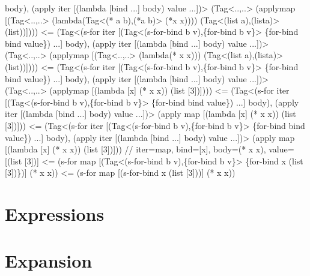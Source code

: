 \begin{Codes}
           body),
         (apply iter [(lambda [bind ...] body) value ...])>
      (Tag<..,..> (apply\C map [(Tag<..,..> (lambda\C [x]
           (Tag<(* a b),(*\C a b)> (*\C x x))))
        (Tag<(list a),(list\C a)> (list\C [3]))])))
<= (Tag<(s-for iter
         [(Tag<(s-for-bind b v),\{for-bind b v\}>
             \{for-bind bind value\}) ...]
           body),
         (apply iter [(lambda [bind ...] body) value ...])>
      (Tag<..,..> (apply\C map [(Tag<..,..> (lambda\C [x] (* x x)))
        (Tag<(list a),(list\C a)> (list\C [3]))])))
<= (Tag<(s-for iter
         [(Tag<(s-for-bind b v),\{for-bind b v\}>
             \{for-bind bind value\}) ...]
           body),
         (apply iter [(lambda [bind ...] body) value ...])>
      (Tag<..,..> (apply\C map [(lambda [x] (* x x))
        (list [3])])))
<= (Tag<(s-for iter
         [(Tag<(s-for-bind b v),\{for-bind b v\}>
             \{for-bind bind value\}) ...]
           body),
         (apply iter [(lambda [bind ...] body) value ...])>
      (apply map [(lambda [x] (* x x)) (list [3])]))
<= (Tag<(s-for iter
         [(Tag<(s-for-bind b v),\{for-bind b v\}>
             \{for-bind bind value\}) ...]
           body),
         (apply iter [(lambda [bind ...] body) value ...])>
      (apply map [(lambda [x] (* x x)) (list [3])]))
  // iter=map, bind=[x], body=(* x x), value=[(list [3])]
<= (s-for map
     [(Tag<(s-for-bind b v),\{for-bind b v\}>
        \{for-bind x (list [3])\})]
     (* x x))
<= (s-for map
     [(s-for-bind x (list [3]))]
     (* x x))
\end{Codes}

\section{Expressions}



\section{Expansion}

